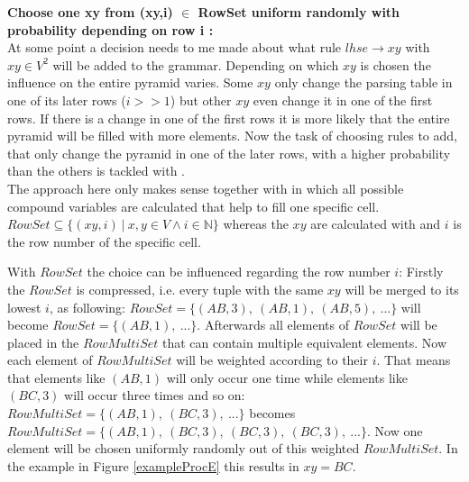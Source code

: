 \noindent \textbf{Choose one xy from (xy,i) $\in$ RowSet uniform randomly with probability depending on row i  :}\\
At some point a decision needs to me made about what rule $lhse\rightarrow xy$ with $xy \in V^2$ will be added to the grammar. Depending on which $xy$ is chosen the influence on the entire pyramid varies. Some $xy$ only change the parsing table in one of its later rows ($i>>1$) but other $xy$ even change it in one of the first rows. If there is a change in one of the first rows it is more likely that the entire pyramid will be filled with more elements. Now the task of choosing rules to add, that only change the pyramid in one of the later rows, with a higher probability than the others is tackled with . \\
The approach here only makes sense together with  in which all possible compound variables are calculated that help to fill one specific cell. $RowSet \subseteq \{(xy,i)\ |\ x,y \in V \wedge i \in \mathbb{N} \}$ whereas the $xy$ are calculated with  and $i$ is the row number of the specific cell. \pagebreak \clearpage

\begin{testexample}
	With $RowSet$ the choice can be influenced regarding the row number $i$: Firstly the $RowSet$ is compressed, i.e. every tuple with the same $xy$ will be merged to its lowest $i$, as following: $RowSet = \{(AB,3),~(AB,1),~(AB,5),~... \}$ will become $RowSet = \{(AB,1),~... \}$. Afterwards all elements of $RowSet$ will be placed in the $RowMultiSet$ that  can contain multiple equivalent elements. Now each element of $RowMultiSet$ will be weighted according to their $i$. That means that elements like $(AB,1)$ will only occur one time while elements like $(BC,3)$ will occur three times and so on: $RowMultiSet = \{(AB,1),~(BC,3),~...\}$ becomes $RowMultiSet = \{(AB,1),~(BC,3),~(BC,3),~(BC,3),~...\}$. Now one element will be chosen uniformly randomly out of this weighted $RowMultiSet$. In the example in Figure \ref{exampleProcE} this results in $xy = BC$.\\
	
	\begin{minipage}{6in}
		\centering
	\end{minipage}
	\label{exampleProcE}
\end{testexample}

